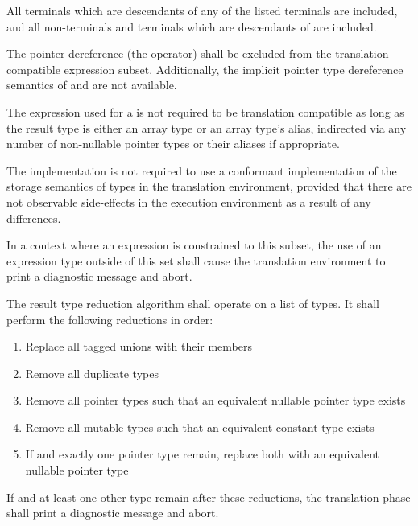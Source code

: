 \vspace{0.25cm}
\specsubitem
All terminals which are descendants of any of the listed terminals are
included, and all non-terminals and terminals which are descendants of
 are included.

\specsubitem
The pointer dereference  (the \terminal{*}
operator) shall be excluded from the translation compatible expression subset.
Additionally, the implicit pointer type dereference semantics of
 and  are
not available.

\specsubitem
The expression used for a  is not required to be
translation compatible as long as the result type is either an array type or an
array type's alias, indirected via any number of non-nullable pointer types or
their aliases if appropriate.

\specsubitem
The implementation is not required to use a conformant implementation of the
storage semantics of types in the translation environment, provided that there
are not observable side-effects in the execution environment as a result of any
differences.

\specsubitem
In a context where an expression is constrained to this subset, the use of an
expression type outside of this set shall cause the translation environment to
print a diagnostic message and abort.


\specsubitem
The result type reduction algorithm shall operate on a list of types. It shall
perform the following reductions in order:

\begin{enumerate}
\item Replace all tagged unions with their members
\item Remove all duplicate types
\item Remove all pointer types such that an equivalent nullable pointer type
	exists
\item Remove all mutable types such that an equivalent constant type exists
\item If  and exactly one pointer type remain, replace both with
	an equivalent nullable pointer type
\end{enumerate}

\specsubitem
If  and at least one other type remain after these reductions,
the translation phase shall print a diagnostic message and abort.

